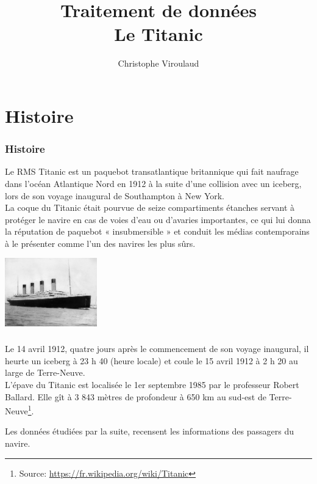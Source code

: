 \documentclass[svgnames,11pt]{beamer}
\author[]{Christophe Viroulaud}
\title{Traitement de données\\ Le Titanic}
\date{}
\institute{Seconde - SNT}
\begin{document}
\begin{frame}
    \titlepage
\end{frame}
\section{Histoire}
\begin{frame}
    \frametitle{Histoire}
    Le RMS Titanic est un paquebot transatlantique britannique qui fait naufrage dans l'océan Atlantique Nord en 1912 à la suite d'une collision avec un iceberg, lors de son voyage inaugural de Southampton à New York.\\ La coque du Titanic était pourvue de seize compartiments étanches servant à protéger le navire en cas de voies d'eau ou d'avaries importantes, ce qui lui donna la réputation de paquebot « insubmersible » et conduit les médias contemporains à le présenter comme l'un des navires les plus sûrs.
    \begin{center}
        \centering
        \includegraphics[width=4cm]{ressources/titanic.jpg}
        \label{IMG}
    \end{center}
\end{frame}
\begin{frame}
    \frametitle{}

    Le 14 avril 1912, quatre jours après le commencement de son voyage inaugural, il heurte un iceberg à 23 h 40 (heure locale) et coule le 15 avril 1912 à 2 h 20 au large de Terre-Neuve.\\
    L'épave du Titanic est localisée le 1er septembre 1985 par le professeur Robert Ballard. Elle gît à 3 843 mètres de profondeur à 650 km au sud-est de Terre-Neuve\footnote{Source: \url{https://fr.wikipedia.org/wiki/Titanic}}.

    Les données étudiées par la suite, recensent les informations des passagers du navire.
\end{frame}
\end{document}
